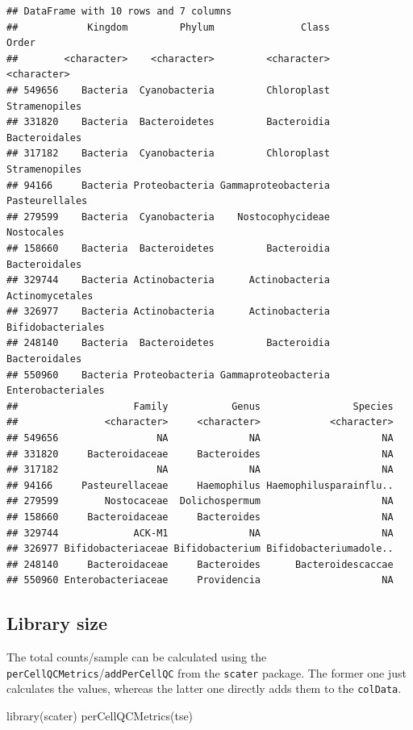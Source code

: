 \documentclass[
]{book}
\newenvironment{Shaded}{\begin{snugshade}}{\end{snugshade}}
\newcommand{\FunctionTok}[1]{\textcolor[rgb]{0.00,0.00,0.00}{#1}}
\newcommand{\NormalTok}[1]{#1}
\begin{document}
\begin{verbatim}
## DataFrame with 10 rows and 7 columns
##            Kingdom         Phylum               Class             Order
##        <character>    <character>         <character>       <character>
## 549656    Bacteria  Cyanobacteria         Chloroplast     Stramenopiles
## 331820    Bacteria  Bacteroidetes         Bacteroidia     Bacteroidales
## 317182    Bacteria  Cyanobacteria         Chloroplast     Stramenopiles
## 94166     Bacteria Proteobacteria Gammaproteobacteria    Pasteurellales
## 279599    Bacteria  Cyanobacteria    Nostocophycideae        Nostocales
## 158660    Bacteria  Bacteroidetes         Bacteroidia     Bacteroidales
## 329744    Bacteria Actinobacteria      Actinobacteria   Actinomycetales
## 326977    Bacteria Actinobacteria      Actinobacteria Bifidobacteriales
## 248140    Bacteria  Bacteroidetes         Bacteroidia     Bacteroidales
## 550960    Bacteria Proteobacteria Gammaproteobacteria Enterobacteriales
##                    Family           Genus                Species
##               <character>     <character>            <character>
## 549656                 NA              NA                     NA
## 331820     Bacteroidaceae     Bacteroides                     NA
## 317182                 NA              NA                     NA
## 94166     Pasteurellaceae     Haemophilus Haemophilusparainflu..
## 279599        Nostocaceae  Dolichospermum                     NA
## 158660     Bacteroidaceae     Bacteroides                     NA
## 329744             ACK-M1              NA                     NA
## 326977 Bifidobacteriaceae Bifidobacterium Bifidobacteriumadole..
## 248140     Bacteroidaceae     Bacteroides      Bacteroidescaccae
## 550960 Enterobacteriaceae     Providencia                     NA
\end{verbatim}

\hypertarget{library-size}{%
\subsection{Library size}\label{library-size}}

The total counts/sample can be calculated using the
\texttt{perCellQCMetrics}/\texttt{addPerCellQC} from the \texttt{scater} package. The former one
just calculates the values, whereas the latter one directly adds them to the
\texttt{colData}.

\begin{Shaded}
\begin{Highlighting}[]
\FunctionTok{library}\NormalTok{(scater)}
\FunctionTok{perCellQCMetrics}\NormalTok{(tse)}
\end{Highlighting}
\end{Shaded}
\end{document}
